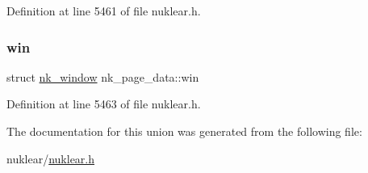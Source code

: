 Definition at line 5461 of file nuklear.\+h.

\mbox{\label{unionnk__page__data_ae954192e5736fbedeb8b4a9242d6d13a}} 
\subsubsection{\texorpdfstring{win}{win}}
{\footnotesize\ttfamily struct \mbox{\hyperlink{structnk__window}{nk\+\_\+window}} nk\+\_\+page\+\_\+data\+::win}



Definition at line 5463 of file nuklear.\+h.



The documentation for this union was generated from the following file\+:\begin{DoxyCompactItemize}
\item 
nuklear/\mbox{\hyperlink{nuklear_8h}{nuklear.\+h}}\end{DoxyCompactItemize}
